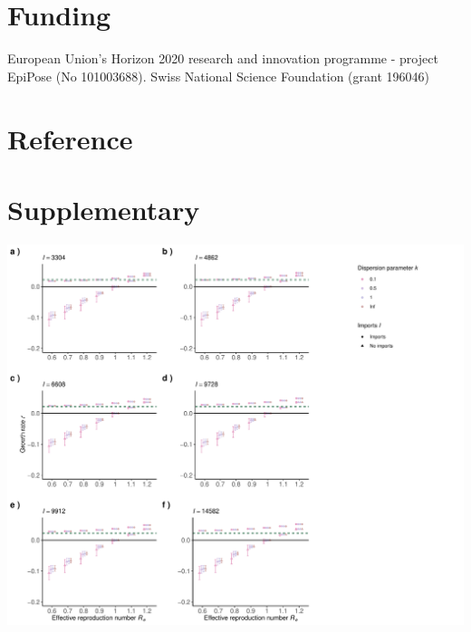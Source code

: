 \documentclass[10pt, a4paper, twoside]{article}
\begin{document}
\begin{multicols}{2}
\section{Funding}
European Union’s Horizon 2020 research and innovation programme - project EpiPose (No 101003688). Swiss National Science Foundation (grant 196046)

\section{Reference}
\printbibliography[heading=none]

\end{multicols}

\clearpage
\section{Supplementary}
\begin{suppfigure}[h]
\centering
\includegraphics[scale=0.5]{growth_r_imports_infect_2021-02-24.pdf}
\caption{Impact of travel associated cases \emph{I} that infect further on the epidemic growth rates: y-axis shows the epidemic growth rate; x-axis different $R_e$ values; intervals show the inter-quantile range (IQR). a) reported travel associated cases. b) reported imports multiplied by following $1+ \frac{\Sigma ~of ~cases ~with ~unknown ~origin }{\Sigma ~of ~all ~confirmed ~cases}$. c) $a)$ multiplied with 2. d) $b)$ multiplied with 2. e,f) $a)$ and $b)$ multiplied with 3, respectively. Abbreviations: k, dispersion parameter; I, number of travel associated cases.}
\end{suppfigure}
\end{document}
